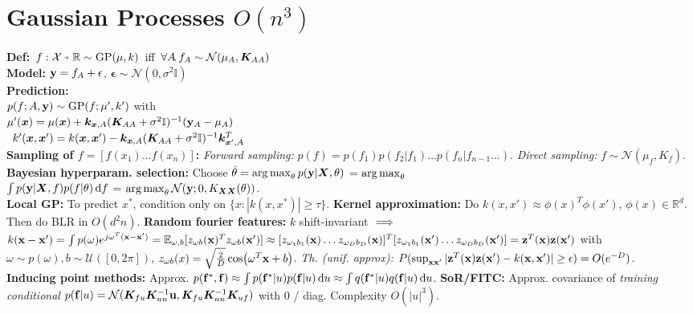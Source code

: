 \section{Gaussian Processes $O(n^3)$}
\mbox{\textbf{Def:} $f: \mathcal{X} \veryshortarrow \mathbb{R} \sim \mathrm{GP}(\mu, k)$ iff $\forall A\!.\, f_A \sim \mathcal{N}(\mu_A, {\bm{K}}_{AA})$}\\
\textbf{Model:} 
${\mathbf{y}} = f_A + \mathbf{\epsilon}$, $\mathbf{\epsilon} \sim \mathcal{N}(0, \sigma^2\mathbb{I})$\\
\textbf{Prediction:}\\
$p(f;A,{\mathbf{y}}) \sim \mathrm{GP}(f;\mu', k')$ with\\
\mbox{\hspace{-0em}$\mu'({\bm{x}}) = \mu({\bm{x}}) + {\bm{k}}_{{\bm{x}},A}({\bm{K}}_{AA} + \sigma^2\mathbb{I})^{-1}({\mathbf{y}}_A - \mu_A)$}\\
\mbox{\hspace{-0em}
$k'({\bm{x}},{\bm{x}}') = k({\bm{x}},{\bm{x}}') - {\bm{k}}_{{\bm{x}},A}({\bm{K}}_{AA}+\sigma^2\mathbb{I})^{-1}{\bm{k}}^T_{{\bm{x}}',A}$}\\
\textbf{Sampling of $f = [f(x_1)\ldots f(x_n)]$:} \emph{Forward sampling:} $p(f) = p(f_1)p(f_2|f_1)\ldots p(f_n|f_{n-1}\ldots)$.
\emph{Direct sampling:} $f\sim\mathcal{N}(\mu_f, K_f)$. 
\textbf{Bayesian hyperparam. selection:} Choose $\hat{\theta}=\operatorname*{arg\,max}_{\theta}p({\mathbf{y}}|{\bm{X}},\theta)$ = $\operatorname*{arg\,max}_{\theta}$\\$\int p({\mathbf{y}}|{\bm{X}},f)p(f|\theta)\dd{f}$ = $\operatorname*{arg\,max}_{\theta}\mathcal{N}({\mathbf{y}};0,K_{{\bm{X}}{\bm{X}}}(\theta))$.\\
\textbf{Local GP:} To predict $x^*$, condition only on $\{x:|k(x,x^*)|\geq\tau\}$.
\textbf{Kernel approximation:} Do $k(x,x')\approx\phi(x)^T\phi(x')$, $\phi(x)\in\mathbb{R}^d$. Then do BLR in $O(d^2n)$.
\textbf{Random fourier features:} $k$ shift-invariant $\color{black} \implies$ $k({\mathbf{x}}-{\mathbf{x}}') = \int p(\omega)e^{j\omega^T({\mathbf{x}}-{\mathbf{x}}')} = \mathbb{E}_{\omega,b}[z_{\omega b}({\mathbf{x}})^Tz_{\omega b}({\mathbf{x}}')] \approx [z_{\omega_1b_1}({\mathbf{x}})\ldots z_{\omega_Db_D}({\mathbf{x}})]^T[z_{\omega_1b_1}({\mathbf{x}}')\ldots z_{\omega_Db_D}({\mathbf{x}}')] = {\mathbf{z}}^T({\mathbf{x}}){\mathbf{z}}({\mathbf{x}}')$ with $\omega\sim p(\omega), b\sim\mathcal{U}([0,2\pi])$, $z_{\omega b}(x) = \sqrt{\frac{2}{D}}\cos(\omega^T{\mathbf{x}} + b)$. \emph{Th. (unif. approx):} $P(\sup_{{\mathbf{x}}{\mathbf{x}}'}|{\mathbf{z}}^T({\mathbf{x}}){\mathbf{z}}({\mathbf{x}}')-k({\mathbf{x}},{\mathbf{x}}')|\geq\epsilon) = O(e^{-D})$.\\
\textbf{Inducing point methods:} Approx. $p({\mathbf{f}}^*,{\mathbf{f}})\approx\int p({\mathbf{f}}^*|u)p({\mathbf{f}}|u)\dd{u}\approx\int q({\mathbf{f}}^*|u)q({\mathbf{f}}|u)\dd{u}$. \textbf{SoR/FITC:} Approx. covariance of \emph{training conditional} $p({\mathbf{f}}|u)=\mathcal{N}({\bm{K}}_{fu}{\bm{K}}_{uu}^{-1}{\mathbf{u}}, {\bm{K}}_{fu}{\bm{K}}_{uu}^{-1}{\bm{K}}_{uf})$ with 0 / diag. Complexity $O(|u|^3)$.

